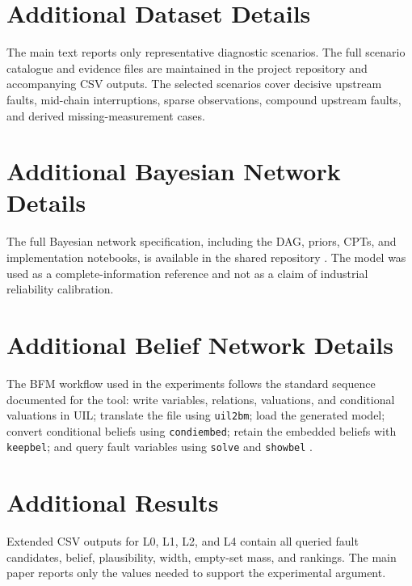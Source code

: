 \documentclass[runningheads]{llncs}
\begin{document}
\appendix

\section{Additional Dataset Details}
\label{app:additional_dataset_details}

The main text reports only representative diagnostic scenarios. The full scenario catalogue and evidence files are maintained in the project repository and accompanying CSV outputs. The selected scenarios cover decisive upstream faults, mid-chain interruptions, sparse observations, compound upstream faults, and derived missing-measurement cases.

\section{Additional Bayesian Network Details}
\label{app:additional_bn_details}

The full Bayesian network specification, including the DAG, priors, CPTs, and implementation notebooks, is available in the shared repository \cite{BNRepository2026}. The model was used as a complete-information reference and not as a claim of industrial reliability calibration.

\section{Additional Belief Network Details}
\label{app:additional_belief_network_details}

The BFM workflow used in the experiments follows the standard sequence documented for the tool: write variables, relations, valuations, and conditional valuations in UIL; translate the file using \texttt{uil2bm}; load the generated model; convert conditional beliefs using \texttt{condiembed}; retain the embedded beliefs with \texttt{keepbel}; and query fault variables using \texttt{solve} and \texttt{showbel} \cite{GiangShenoy2003BFM}.

\section{Additional Results}
\label{app:additional_results}

Extended CSV outputs for L0, L1, L2, and L4 contain all queried fault candidates, belief, plausibility, width, empty-set mass, and rankings. The main paper reports only the values needed to support the experimental argument.




\end{document}
